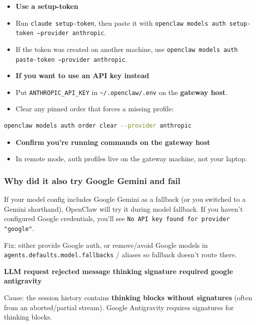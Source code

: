 \begin{itemize}
  \item \textbf{Use a setup-token}
  \item Run \texttt{claude setup-token}, then paste it with \texttt{openclaw models auth setup-token --provider anthropic}.
  \item If the token was created on another machine, use \texttt{openclaw models auth paste-token --provider anthropic}.
  \item \textbf{If you want to use an API key instead}
  \item Put \texttt{ANTHROPIC\_API\_KEY} in \texttt{\textasciitilde{}/.openclaw/.env} on the \textbf{gateway host}.
  \item Clear any pinned order that forces a missing profile:
\end{itemize}


\begin{lstlisting}[language=bash]
    openclaw models auth order clear --provider anthropic
\end{lstlisting}


\begin{itemize}
  \item \textbf{Confirm you're running commands on the gateway host}
  \item In remote mode, auth profiles live on the gateway machine, not your laptop.
\end{itemize}


\subsubsection{Why did it also try Google Gemini and fail}


If your model config includes Google Gemini as a fallback (or you switched to a Gemini shorthand), OpenClaw will try it during model fallback. If you haven't configured Google credentials, you'll see \texttt{No API key found for provider "google"}.

Fix: either provide Google auth, or remove/avoid Google models in \texttt{agents.defaults.model.fallbacks} / aliases so fallback doesn't route there.

\textbf{LLM request rejected message thinking signature required google antigravity}

Cause: the session history contains \textbf{thinking blocks without signatures} (often from
an aborted/partial stream). Google Antigravity requires signatures for thinking blocks.

